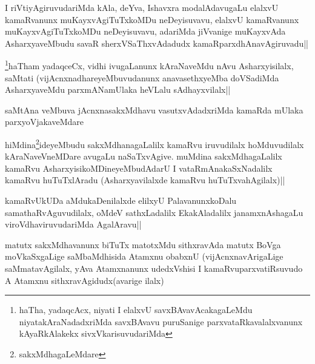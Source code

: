 
\begin{artha}
I riVtiyAgiruvudariMda kAla, deYva, Ishavxra modalAdavugaLu elalxvU kamaRvanunx muKayxvAgiTuTxkoMDu neDeyisuvavu, elalxvU kamaRvanunx muKayxvAgiTuTxkoMDu neDeyisuvavu, adariMda jiVvanige muKayxvAda AsharxyaveMbudu savaR sherxVSaThxvAdadudx kamaRparxdhAnavAgiruvadu||
\end{artha}

\begin{artha}
\footnote{haTha, yadaqcAcx, niyati I elalxvU savxBAvavAcakagaLeMdu niyatakAraNadadxriMda savxBAvavu puruSanige parxvataRkavalalxvanunx kAyaRkAlakekx sivxVkarisuvudariMda}haTham yadaqceCx, vidhi ivugaLanunx kAraNaveMdu nAvu Asharxyisilalx, saMtati (vijAcnxnadhareyeMbuvudanunx anavasethxyeMba doVSadiMda AsharxyaveMdu parxmANamUlaka heVLalu sAdhayxvilalx||
\end{artha}


\begin{artha}
saMtAna veMbuva jAcnxnasakxMdhavu vasutxvAdadxriMda kamaRda mUlaka parxyoVjakaveMdare
\end{artha}

\begin{artha}
hiMdina\footnote[2]{sakxMdhagaLeMdare}ideyeMbudu sakxMdhanagaLalilx kamaRvu iruvudilalx hoMduvudilalx kAraNaveVneMDare avugaLu naSaTxvAgive. muMdina sakxMdhagaLalilx kamaRvu AsharxyisikoMDineyeMbudAdarU I vataRmAnakaSxNadalilx kamaRvu huTuTxlAradu (Asharxyavilalxde kamaRvu huTuTxvahAgilalx)||
\end{artha}


\begin{artha}
kamaRvUkUDa aMdukaDenilalxde elilxyU PalavanunxkoDalu samathaRvAguvudilalx, oMdeV sathxLadalilx EkakAladalilx janamxnAshagaLu viroVdhaviruvudariMda AgalAravu||
\end{artha}

\begin{artha}
matutx sakxMdhavanunx biTuTx matotxMdu sithxravAda matutx BoVga moVkaSxgaLige saMbaMdhisida Atamxnu obabxnU (vijAcnxnavArigaLige saMmatavAgilalx, yAva Atamxnanunx udedxVshisi I kamaRvuparxvatiRsuvudo A Atamxnu sithxravAgidudx(avarige ilalx)
\end{artha}

